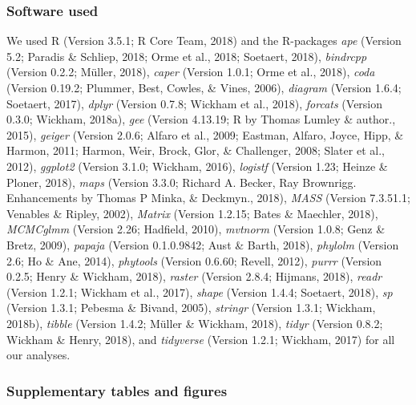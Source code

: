 \documentclass[man,floatsintext]{apa6}
\theoremstyle{definition}
\theoremstyle{definition}
\theoremstyle{definition}
\theoremstyle{remark}
\begin{document}
\hypertarget{software-used}{%
\subsubsection{Software used}\label{software-used}}

We used R (Version 3.5.1; R Core Team, 2018) and the R-packages
\emph{ape} (Version 5.2; Paradis \& Schliep, 2018; Orme et al., 2018;
Soetaert, 2018), \emph{bindrcpp} (Version 0.2.2; Müller, 2018),
\emph{caper} (Version 1.0.1; Orme et al., 2018), \emph{coda} (Version
0.19.2; Plummer, Best, Cowles, \& Vines, 2006), \emph{diagram} (Version
1.6.4; Soetaert, 2017), \emph{dplyr} (Version 0.7.8; Wickham et al.,
2018), \emph{forcats} (Version 0.3.0; Wickham, 2018a), \emph{gee}
(Version 4.13.19; R by Thomas Lumley \& author., 2015), \emph{geiger}
(Version 2.0.6; Alfaro et al., 2009; Eastman, Alfaro, Joyce, Hipp, \&
Harmon, 2011; Harmon, Weir, Brock, Glor, \& Challenger, 2008; Slater et
al., 2012), \emph{ggplot2} (Version 3.1.0; Wickham, 2016),
\emph{logistf} (Version 1.23; Heinze \& Ploner, 2018), \emph{maps}
(Version 3.3.0; Richard A. Becker, Ray Brownrigg. Enhancements by Thomas
P Minka, \& Deckmyn., 2018), \emph{MASS} (Version 7.3.51.1; Venables \&
Ripley, 2002), \emph{Matrix} (Version 1.2.15; Bates \& Maechler, 2018),
\emph{MCMCglmm} (Version 2.26; Hadfield, 2010), \emph{mvtnorm} (Version
1.0.8; Genz \& Bretz, 2009), \emph{papaja} (Version 0.1.0.9842; Aust \&
Barth, 2018), \emph{phylolm} (Version 2.6; Ho \& Ane, 2014),
\emph{phytools} (Version 0.6.60; Revell, 2012), \emph{purrr} (Version
0.2.5; Henry \& Wickham, 2018), \emph{raster} (Version 2.8.4; Hijmans,
2018), \emph{readr} (Version 1.2.1; Wickham et al., 2017), \emph{shape}
(Version 1.4.4; Soetaert, 2018), \emph{sp} (Version 1.3.1; Pebesma \&
Bivand, 2005), \emph{stringr} (Version 1.3.1; Wickham, 2018b),
\emph{tibble} (Version 1.4.2; Müller \& Wickham, 2018), \emph{tidyr}
(Version 0.8.2; Wickham \& Henry, 2018), and \emph{tidyverse} (Version
1.2.1; Wickham, 2017) for all our analyses.

\hypertarget{supplementary-tables-and-figures}{%
\subsubsection{Supplementary tables and
figures}\label{supplementary-tables-and-figures}}
\end{document}
